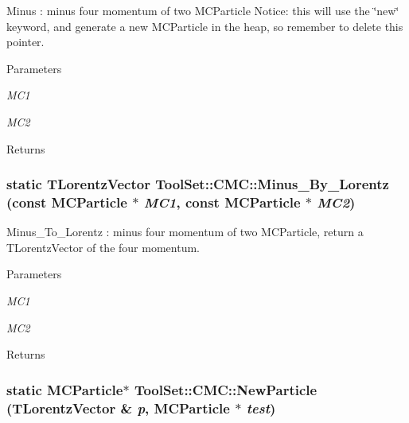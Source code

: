 Minus : minus four momentum of two MCParticle Notice: this will use the \char`\"{}new\char`\"{} keyword, and generate a new MCParticle in the heap, so remember to delete this pointer. 
\begin{DoxyParams}{Parameters}
\item[{\em MC1}]\item[{\em MC2}]\end{DoxyParams}
\begin{DoxyReturn}{Returns}

\end{DoxyReturn}
\hypertarget{classToolSet_1_1CMC_a5883ceda367cc5e32cbacdabdc119a4a}{
\subsubsection[{Minus\_\-By\_\-Lorentz}]{\setlength{\rightskip}{0pt plus 5cm}static TLorentzVector ToolSet::CMC::Minus\_\-By\_\-Lorentz (const MCParticle $\ast$ {\em MC1}, \/  const MCParticle $\ast$ {\em MC2})}}
\label{classToolSet_1_1CMC_a5883ceda367cc5e32cbacdabdc119a4a}


Minus\_\-To\_\-Lorentz : minus four momentum of two MCParticle, return a TLorentzVector of the four momentum. 
\begin{DoxyParams}{Parameters}
\item[{\em MC1}]\item[{\em MC2}]\end{DoxyParams}
\begin{DoxyReturn}{Returns}

\end{DoxyReturn}
\hypertarget{classToolSet_1_1CMC_a5bd1a7515135570ef348bd77d1d26933}{
\subsubsection[{NewParticle}]{\setlength{\rightskip}{0pt plus 5cm}static MCParticle$\ast$ ToolSet::CMC::NewParticle (TLorentzVector \& {\em p}, \/  MCParticle $\ast$ {\em test})}}
\label{classToolSet_1_1CMC_a5bd1a7515135570ef348bd77d1d26933}


